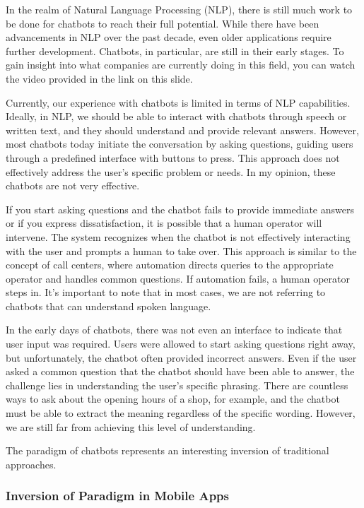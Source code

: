 In the realm of Natural Language Processing (NLP), there is still much
work to be done for chatbots to reach their full potential. While there
have been advancements in NLP over the past decade, even older
applications require further development. Chatbots, in particular, are
still in their early stages. To gain insight into what companies are
currently doing in this field, you can watch the video provided in the
link on this slide.

Currently, our experience with chatbots is limited in terms of NLP
capabilities. Ideally, in NLP, we should be able to interact with
chatbots through speech or written text, and they should understand and
provide relevant answers. However, most chatbots today initiate the
conversation by asking questions, guiding users through a predefined
interface with buttons to press. This approach does not effectively
address the user's specific problem or needs. In my opinion, these
chatbots are not very effective.

If you start asking questions and the chatbot fails to provide immediate
answers or if you express dissatisfaction, it is possible that a human
operator will intervene. The system recognizes when the chatbot is not
effectively interacting with the user and prompts a human to take over.
This approach is similar to the concept of call centers, where
automation directs queries to the appropriate operator and handles
common questions. If automation fails, a human operator steps in. It's
important to note that in most cases, we are not referring to chatbots
that can understand spoken language.

In the early days of chatbots, there was not even an interface to
indicate that user input was required. Users were allowed to start
asking questions right away, but unfortunately, the chatbot often
provided incorrect answers. Even if the user asked a common question
that the chatbot should have been able to answer, the challenge lies in
understanding the user's specific phrasing. There are countless ways to
ask about the opening hours of a shop, for example, and the chatbot must
be able to extract the meaning regardless of the specific wording.
However, we are still far from achieving this level of understanding.

The paradigm of chatbots represents an interesting inversion of
traditional approaches.


\subsubsection{Inversion of Paradigm in Mobile
  Apps}\label{inversion-of-paradigm-in-mobile-apps}

